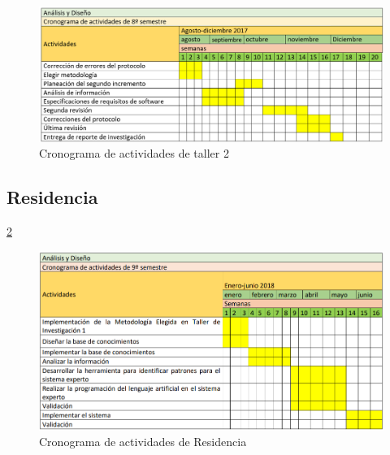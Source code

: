     \begin{figure}[h]
      \centering
      \includegraphics[scale=.7]{lib/assets/cronogramataller2}
      \caption{Cronograma de actividades de taller 2}
      \label{Taller2}
    \end{figure}


    \subsection{Residencia}\ref{Residencia}

    \begin{figure}[h]
      \centering
      \includegraphics[scale=.7]{lib/assets/cronograma-8-9-2}
      \caption{Cronograma de actividades de Residencia}
      \label{Residencia}
    \end{figure}
